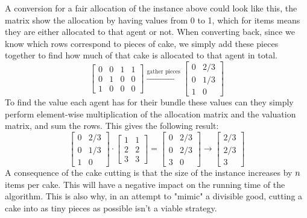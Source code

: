 A conversion for a fair allocation of the instance above could look like this, the matrix show the allocation by having values from 0 to 1, which for items means they are either allocated to that agent or not. When converting back, since we know which rows correspond to pieces of cake, we simply add these pieces together to find how much of that cake is allocated to that agent in total.
$$
    \begin{bmatrix}
        0 & 0 & 1 & 1 \\
        0 & 1 & 0 & 0 \\
        1 & 0 & 0 & 0
    \end{bmatrix}
    \overset{\text{gather pieces}}{\rightarrow}
    \begin{bmatrix}
        0 & 2/3 \\
        0 & 1/3 \\
        1 & 0
    \end{bmatrix}
$$
To find the value each agent has for their bundle these values can they simply perform element-wise multiplication of the allocation matrix and the valuation matrix, and sum the rows. This gives the following result:
$$
    \begin{bmatrix}
        0 & 2/3 \\
        0 & 1/3 \\
        1 & 0
    \end{bmatrix}
    \cdot
    \begin{bmatrix}
        1 & 1 \\
        2 & 2 \\
        3 & 3
    \end{bmatrix}
    =
    \begin{bmatrix}
        0 & 2/3 \\
        0 & 2/3 \\
        3 & 0
    \end{bmatrix}
    \rightarrow
    \begin{bmatrix}
        2/3 \\
        2/3 \\
        3
    \end{bmatrix}
$$
A consequence of the cake cutting is that the size of the instance increases by $n$ items per cake. This will have a negative impact on the running time of the algorithm. This is also why, in an attempt to "mimic" a divisible good, cutting a cake into as tiny pieces as possible isn't a viable strategy. 







